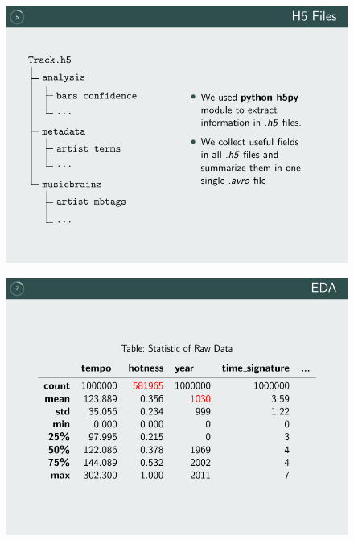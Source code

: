 \documentclass[hyperref={pdfpagelabels=false}]{beamer}
\begin{document}
\begin{frame}
\begin{textblock}{45}
\begin{basebox}[title=Data Preparation,opacitybacktitle=.45,colbacktitle=green!10,colframe=grey!65!black, halign title=left]
        \begin{minipage}{0.35\linewidth}
            \begin{figure}
                \centering
                \includegraphics[width=\textwidth]{pdf/p5.pdf}
            \end{figure}
        \end{minipage}
        \begin{minipage}{0.64\linewidth}
            \begin{figure}
                \centering
                \includegraphics[width=\textwidth]{pdf/p7.pdf}
            \end{figure}
            \begin{figure}

\end{figure}
\end{minipage}
\end{basebox}
\end{textblock}
\end{frame}
\end{document}
